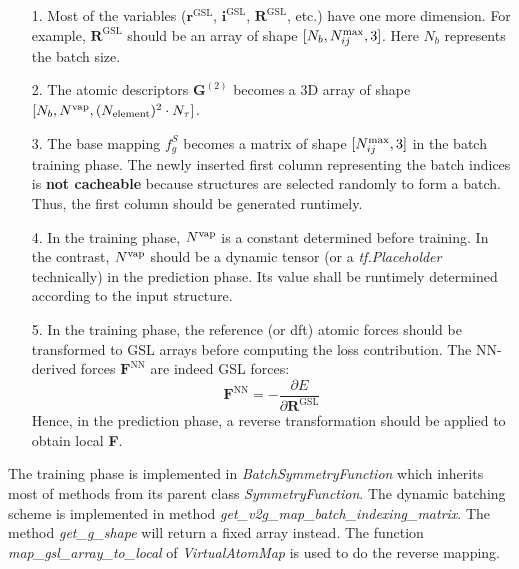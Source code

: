 \documentclass[final,1p,times]{elsarticle}
\begin{document}
\begin{itemize}
    
    \item[1.] 
    Most of the variables ($\mathbf{r}^{\mathrm{GSL}}$, 
    $\mathbf{i}^{\mathrm{GSL}}$, $\mathbf{R}^{\mathrm{GSL}}$, etc.) have one 
    more dimension. For example, $\mathbf{R}^{\mathrm{GSL}}$ should be an array
    of shape $[N_b, N_{ij}^{\mathrm{max}}, 3]$. Here $N_{b}$ represents the batch size.

    \item[2.]
    The atomic descriptors $\mathbf{G}^{(2)}$ becomes a 3D array of shape 
    $[N_b, N^{\mathrm{vap}}, (N_{\mathrm{element}})^2 \cdot N_{\tau}]$.

    \item[3.] 
    The base mapping $f_{g}^{S}$ becomes a matrix of shape $[N_{ij}^{\mathrm{max}}, 3]$ in the 
    batch training phase. The newly inserted first column 
    \textemdash representing the batch indices \textemdash is 
    \textbf{not cacheable} because structures are selected randomly to form a 
    batch. Thus, the first column should be generated runtimely.

    \item[4.]
    In the training phase, $N^{\mathrm{vap}}$ is a constant determined before training. In 
    the contrast, $N^{\mathrm{vap}}$ should be a dynamic tensor 
    (or a \textit{tf.Placeholder} technically) in the prediction phase.
    Its value shall be runtimely determined according to the input structure. 

    \item[5.]
    In the training phase, the reference (or dft) atomic forces should be 
    transformed to GSL arrays before computing the loss contribution. The 
    NN-derived forces $\mathbf{F}^{\mathrm{NN}}$ are indeed GSL forces:
    \begin{equation}
        \mathbf{F}^{\mathrm{NN}} = 
        -\frac{\partial{E}}{\partial{\mathbf{R}^{\mathrm{GSL}}}}
    \end{equation}
    Hence, in the prediction phase, a reverse transformation should be applied 
    to obtain local \textbf{F}.

\end{itemize}

The training phase is implemented in \textit{BatchSymmetryFunction} which 
inherits most of methods from its parent class \textit{SymmetryFunction}. 
The dynamic batching scheme is implemented in method 
\textit{get\_v2g\_map\_batch\_indexing\_matrix}. The method 
\textit{get\_g\_shape} will return a fixed array instead. The function
\textit{map\_gsl\_array\_to\_local} of \textit{VirtualAtomMap} is used to do the 
reverse mapping.
\end{document}
